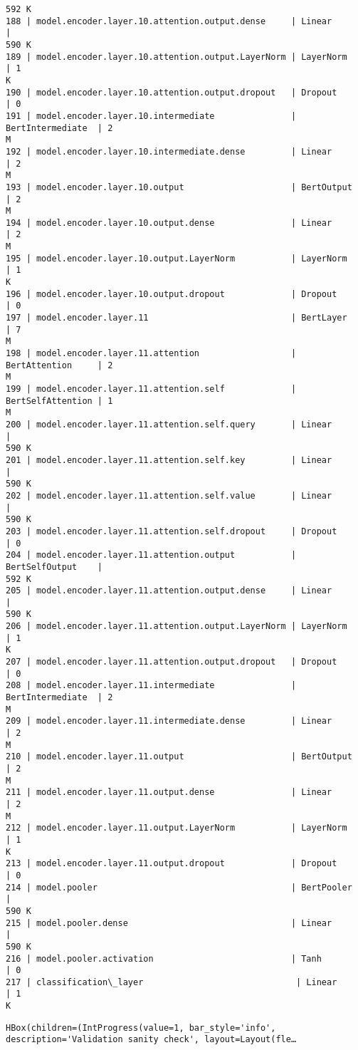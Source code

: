 \documentclass[10pt]{article}
\begin{document}
\begin{Verbatim}[commandchars=\\\{\}]
592 K
188 | model.encoder.layer.10.attention.output.dense     | Linear            |
590 K
189 | model.encoder.layer.10.attention.output.LayerNorm | LayerNorm         | 1
K
190 | model.encoder.layer.10.attention.output.dropout   | Dropout           | 0
191 | model.encoder.layer.10.intermediate               | BertIntermediate  | 2
M
192 | model.encoder.layer.10.intermediate.dense         | Linear            | 2
M
193 | model.encoder.layer.10.output                     | BertOutput        | 2
M
194 | model.encoder.layer.10.output.dense               | Linear            | 2
M
195 | model.encoder.layer.10.output.LayerNorm           | LayerNorm         | 1
K
196 | model.encoder.layer.10.output.dropout             | Dropout           | 0
197 | model.encoder.layer.11                            | BertLayer         | 7
M
198 | model.encoder.layer.11.attention                  | BertAttention     | 2
M
199 | model.encoder.layer.11.attention.self             | BertSelfAttention | 1
M
200 | model.encoder.layer.11.attention.self.query       | Linear            |
590 K
201 | model.encoder.layer.11.attention.self.key         | Linear            |
590 K
202 | model.encoder.layer.11.attention.self.value       | Linear            |
590 K
203 | model.encoder.layer.11.attention.self.dropout     | Dropout           | 0
204 | model.encoder.layer.11.attention.output           | BertSelfOutput    |
592 K
205 | model.encoder.layer.11.attention.output.dense     | Linear            |
590 K
206 | model.encoder.layer.11.attention.output.LayerNorm | LayerNorm         | 1
K
207 | model.encoder.layer.11.attention.output.dropout   | Dropout           | 0
208 | model.encoder.layer.11.intermediate               | BertIntermediate  | 2
M
209 | model.encoder.layer.11.intermediate.dense         | Linear            | 2
M
210 | model.encoder.layer.11.output                     | BertOutput        | 2
M
211 | model.encoder.layer.11.output.dense               | Linear            | 2
M
212 | model.encoder.layer.11.output.LayerNorm           | LayerNorm         | 1
K
213 | model.encoder.layer.11.output.dropout             | Dropout           | 0
214 | model.pooler                                      | BertPooler        |
590 K
215 | model.pooler.dense                                | Linear            |
590 K
216 | model.pooler.activation                           | Tanh              | 0
217 | classification\_layer                              | Linear            | 1
K
    \end{Verbatim}

    
    \begin{verbatim}
HBox(children=(IntProgress(value=1, bar_style='info', description='Validation sanity check', layout=Layout(fle…
    \end{verbatim}
\end{document}
